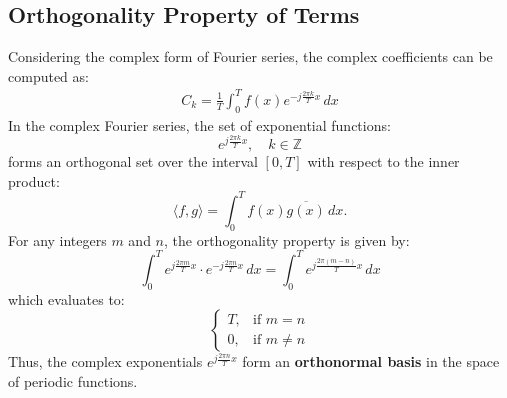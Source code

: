 \begin{multicols}{2}
\subsection{Orthogonality Property of Terms}
Considering the complex form of Fourier series, the complex coefficients can be computed as:
\begin{align}
C_k = \frac{1}{T} \int_{0}^{T} f(x) e^{-j \frac{2\pi k}{T} x} \, dx 
\end{align}
In the complex Fourier series, the set of exponential functions:
\[
e^{j \frac{2\pi k}{T} x}, \quad k \in \mathbb{Z}
\]
forms an orthogonal set over the interval \( [0, T] \) with respect to the inner product:
\[
\langle f, g \rangle = \int_{0}^{T} f(x) \overline{g(x)} \, dx.
\]
For any integers \( m \) and \( n \), the orthogonality property is given by:
\[
\int_{0}^{T} e^{j \frac{2\pi m}{T} x} \cdot e^{-j \frac{2\pi n}{T} x} \, dx
= \int_{0}^{T} e^{j \frac{2\pi (m-n)}{T} x} \, dx
\]
which evaluates to:
\[
\begin{cases}
T, & \text{if } m = n \\
0, & \text{if } m \neq n
\end{cases}
\]
Thus, the complex exponentials \( e^{j \frac{2\pi n}{T} x} \) form an \textbf{orthonormal basis} in the space of periodic functions.


\end{multicols}
